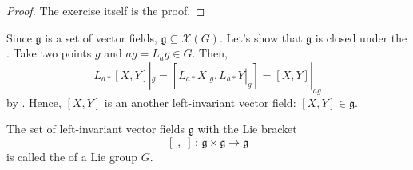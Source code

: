 \documentclass[a4paper, 10pt]{article}
\begin{document}
\begin{proof}
    The exercise itself is the proof.
\end{proof}

\begin{obs}
    Since $\mathfrak{g}$ is a set of vector fields, $\mathfrak{g} \subseteq \mathscr{X}(G)$. Let's show that $\mathfrak{g}$ is closed under the . Take two points $g$ and $ag = L_{a}g \in G$. Then,
    \[ L_{a\ast}[X,Y]|_{g} = [L_{a\ast}X|_{g}, L_{a\ast}Y|_{g}] = [X,Y]|_{ag} \]
    by . Hence, $[X,Y]$ is an another left-invariant vector field: $[X,Y] \in \mathfrak{g}$.
\end{obs}

\begin{definition}
    The set of left-invariant vector fields $\mathfrak{g}$ with the Lie bracket
    \[ [\;,\;] \,:\, \mathfrak{g} \times \mathfrak{g} \rightarrow \mathfrak{g} \]
    is called the  of a Lie group $G$.
\end{definition}
\end{document}
